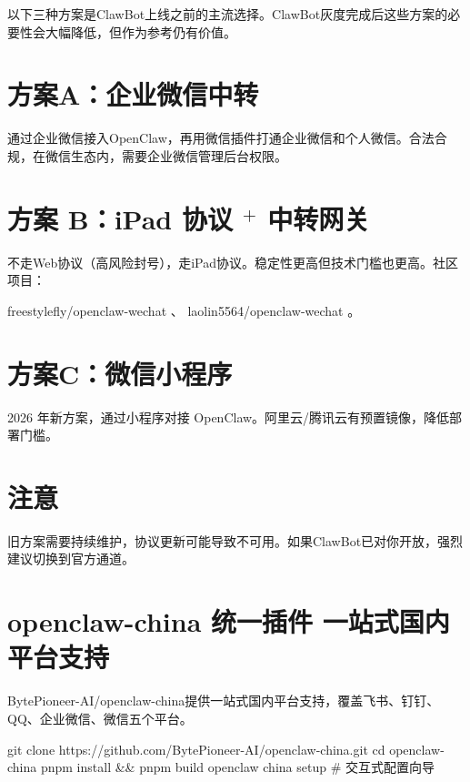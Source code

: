 \documentclass[
  10
]{article}
\newenvironment{Shaded}{}{}
\newcommand{\NormalTok}[1]{#1}
\begin{document}
以下三种方案是ClawBot上线之前的主流选择。ClawBot灰度完成后这些方案的必要性会大幅降低，但作为参考仍有价值。

\section{方案A：企业微信中转}\label{ux65b9ux6848aux4f01ux4e1aux5faeux4fe1ux4e2dux8f6c}

通过企业微信接入OpenClaw，再用微信插件打通企业微信和个人微信。合法合规，在微信生态内，需要企业微信管理后台权限。

\section{\texorpdfstring{方案 B：iPad 协议 \(^ +\)
中转网关}{方案 B：iPad 协议 \^{} + 中转网关}}\label{ux65b9ux6848-bipad-ux534fux8bae-ux4e2dux8f6cux7f51ux5173}

不走Web协议（高风险封号），走iPad协议。稳定性更高但技术门槛也更高。社区项目：

freestylefly/openclaw-wechat 、 laolin5564/openclaw-wechat 。

\section{方案C：微信小程序}\label{ux65b9ux6848cux5faeux4fe1ux5c0fux7a0bux5e8f}

2026 年新方案，通过小程序对接
OpenClaw。阿里云/腾讯云有预置镜像，降低部署门槛。

\section{注意}\label{ux6ce8ux610f-9}

旧方案需要持续维护，协议更新可能导致不可用。如果ClawBot已对你开放，强烈建议切换到官方通道。

\section{openclaw-china 统一插件
⼀站式国内平台⽀持}\label{openclaw-china-ux7edfux4e00ux63d2ux4ef6-ux7ad9ux5f0fux56fdux5185ux5e73ux53f0ux6301}

BytePioneer-AI/openclaw-china提供一站式国内平台支持，覆盖飞书、钉钉、QQ、企业微信、微信五个平台。

\begin{Shaded}
\begin{Highlighting}[]
\NormalTok{git clone https://github.com/BytePioneer{-}AI/openclaw{-}china.git  }
\NormalTok{cd openclaw{-}china  }
\NormalTok{pnpm install \&\& pnpm build  }
\NormalTok{openclaw china setup \# 交互式配置向导}
\end{Highlighting}
\end{Shaded}
\end{document}
